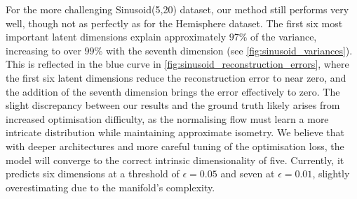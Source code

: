     For the more challenging Sinusoid(5,20) dataset, our method still performs very well, though not as perfectly as for the Hemisphere dataset. The first six most important latent dimensions explain approximately $97\%$ of the variance, increasing to over $99\%$ with the seventh dimension (see \ref{fig:sinusoid_variances}). This is reflected in the blue curve in \ref{fig:sinusoid_reconstruction_errors}, where the first six latent dimensions reduce the reconstruction error to near zero, and the addition of the seventh dimension brings the error effectively to zero. The slight discrepancy between our results and the ground truth likely arises from increased optimisation difficulty, as the normalising flow must learn a more intricate distribution while maintaining approximate isometry. We believe that with deeper architectures and more careful tuning of the optimisation loss, the model will converge to the correct intrinsic dimensionality of five. Currently, it predicts six dimensions at a threshold of $\epsilon = 0.05$ and seven at $\epsilon = 0.01$, slightly overestimating due to the manifold's complexity.
    

